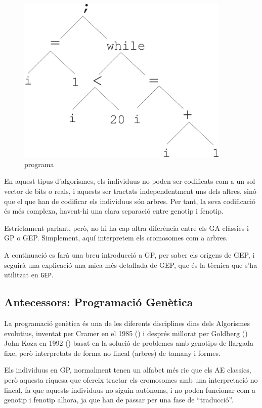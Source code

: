 \begin{figure} \centering \includegraphics[width=4in]{intro/6-3.jpg}
\caption{\label{fig:6-3}programa}
\end{figure}
En aquest tipus d'algorismes, els individuus no poden ser codificats com a un
sol vector de bits o reals, i aquests ser tractats independentment uns dels
altres, sinó que el que han de codificar els individuus són arbres.  Per tant,
la seva codificació és més complexa, havent-hi una clara separació entre genotip
i fenotip.

Estrictament parlant, però, no hi ha cap altra diferència entre els GA clàssics
i GP o GEP.  Simplement, aquí interpretem els cromosomes com a arbres.

A continuació es farà una breu introducció a GP, per saber els orígens de
GEP, i seguirà una explicació una mica més detallada de GEP, que és la tècnica
que s'ha utilitzat en \texttt{GEP}.

\subsection{Antecessors: Programació Genètica} %
\label{sub:Ant. Programacio Genetica}
La programació genètica és una de les diferents disciplines dins dels Algorismes
evolutius, inventat per Cramer en el 1985 (\cite{C85}) i després millorat per
Goldberg (\cite{Goldberg:89})
John Koza en 1992 (\cite{koza:92}) basat en la solució de problemes amb genotips de
llargada fixe, però interpretats de forma no lineal (arbres) de tamany i formes.

Els individuus en GP, normalment tenen un alfabet més ric que els AE classics,
però aquesta riquesa que ofereix tractar els cromosomes amb una interpretació
no lineal, fa que aquests individuus no siguin autònoms, i no poden funcionar
com a genotip i fenotip alhora, ja que han de passar per una fase de
``traducció''.

